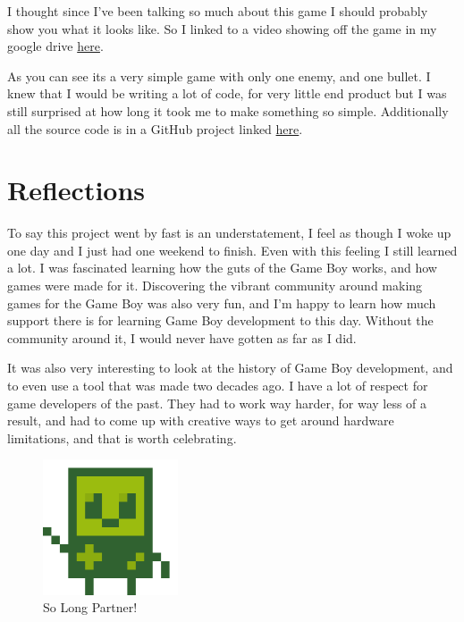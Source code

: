 \documentclass{article}
\begin{document}
I thought since I've been talking so much about this game I should probably show you what it looks like. So I linked to a video showing off the game in my google drive \href{https://drive.google.com/file/d/1OmkPDGYeArlN-L3-UX6Kt9uyR1fwKF4a/view?usp=sharing}{here}.  

As you can see its a very simple game with only one enemy, and one bullet. I knew that I would be writing a lot of code, for very little end product but I was still surprised at how long it took me to make something so simple. Additionally all the source code is in a GitHub project linked \href{https://github.com/JohnnyG1234/ComputerArchFinal}{here}.

\section{Reflections}

To say this project went by fast is an understatement, I feel as though I woke up one day and I just had one weekend to finish. Even with this feeling I still learned a lot. I was fascinated learning how the guts of the Game Boy works, and how games were made for it. Discovering the vibrant community around making games for the Game Boy was also very fun, and I'm happy to learn how much support there is for learning Game Boy development to this day. Without the community around it, I would never have gotten as far as I did. 

It was also very interesting to look at the history of Game Boy development, and to even use a tool that was made two decades ago. I have a lot of respect for game developers of the past. They had to work way harder, for way less of a result, and had to come up with creative ways to get around hardware limitations, and that is worth celebrating.

\begin{figure}[htp]
    \centering
    \includegraphics[width=4cm]{images/gameBoy.png}
    \caption{So Long Partner!}
    \label{Game Boy!}
\end{figure}
\end{document}

